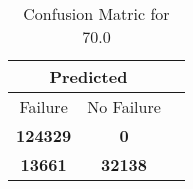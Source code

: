 \begin{table}[] 
\caption{Confusion Matric for 70.0} 
\label{Table: Prediction Accuracy-DMD70.0OnlySunEKF-resetReflectionperfectNoFailurePrediction-Reflection} 
\centering 
\begin{tabular} 
 {@{}ccc@{}} 
\toprule 
\multicolumn{2}{c}{\textbf{Predicted}}
 \\ \midrule 
\multicolumn{1}{|c|}{Failure} & 
\multicolumn{1}{c|}{No Failure}
 \\ \midrule 
\multicolumn{1}{|c|}{\color{green}\textbf{124329}} & 
\multicolumn{1}{c|}{\color{red}\textbf{0}}
 \\ \midrule 
\multicolumn{1}{|c|}{\color{red}\textbf{13661}} & 
\multicolumn{1}{c|}{\color{green}\textbf{32138}}
 \\ \bottomrule 
\end{tabular} 
\end{table} 
